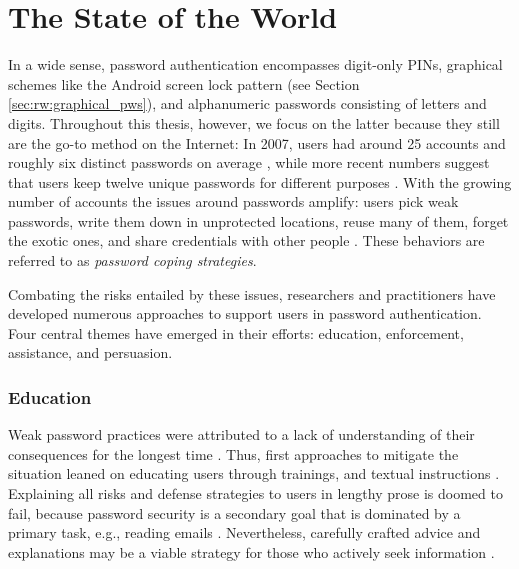 \section{The State of the World}
In a wide sense, password authentication encompasses digit-only \glspl{PIN}, graphical schemes like the Android screen lock pattern (see Section \ref{sec:rw:graphical_pws}), and alphanumeric passwords consisting of letters and digits. Throughout this thesis, however, we focus on the latter because they still are the go-to method on the Internet: In 2007, users had around 25 accounts and roughly six distinct passwords on average \cite{Florencio2007LargeScaleStudyPasswordHabits}, while more recent numbers suggest that users keep twelve unique passwords for different purposes \cite{Wash2016UnderstandingPasswordChoices}. With the growing number of accounts the issues around passwords amplify: users pick weak passwords, write them down in unprotected locations, reuse many of them, forget the exotic ones, and share credentials with other people \cite{Stobert2014PasswordLifeCycle}. These behaviors are referred to as \textit{password coping strategies}.

Combating the risks entailed by these issues, researchers and practitioners have developed numerous approaches to support users in password authentication. Four central themes have emerged in their efforts: education, enforcement, assistance, and persuasion. 

\subsubsection{Education}
Weak password practices were attributed to a lack of understanding of their consequences for the longest time \cite{Sasse2001WeakestLink}. Thus, first approaches to mitigate the situation leaned on educating users through trainings, and textual instructions \cite{Herley2009SoLongThanksExternalities}. Explaining all risks and defense strategies to users in lengthy prose is doomed to fail, because password security is a secondary goal that is dominated by a primary task, e.g., reading emails \cite{Whitten1999WhyJohnnyCantEncrypt}. Nevertheless, carefully crafted advice and explanations may be a viable strategy for those who actively seek information \cite{Sasse2005UsableSecurityPosition, Ur2017DataDrivenPWMeter}. 

